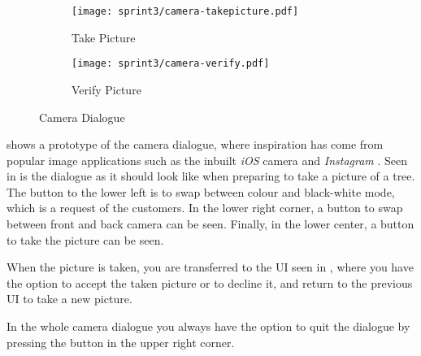 \begin{figure}[h]
     \centering
     \begin{subfigure}{0.45\textwidth}
          \texttt{[image: sprint3/camera-takepicture.pdf]}
          \caption{Take Picture}
          \label{fig:cam-takepic}
     \end{subfigure}      
     \begin{subfigure}{0.45\textwidth}
          \texttt{[image: sprint3/camera-verify.pdf]}
          \caption{Verify Picture}
          \label{fig:cam-verifypic}
     \end{subfigure}
     \caption{Camera Dialogue}
     \label{fig:cam-dialogue}
\end{figure}

 shows a prototype of the camera dialogue, where inspiration has come from popular image applications such as the inbuilt \textit{iOS} \cite{misc:ios} camera and \textit{Instagram} \citep{misc:instagram}.
Seen in  is the dialogue as it should look like when preparing to take a picture of a tree.
The button to the lower left is to swap between colour and black-white mode, which is a request of the customers.
In the lower right corner, a button to swap between front and back camera can be seen.
Finally, in the lower center, a button to take the picture can be seen.

When the picture is taken, you are transferred to the UI seen in , where you have the option to accept the taken picture or to decline it, and return to the previous UI to take a new picture.

In the whole camera dialogue you always have the option to quit the dialogue by pressing the button in the upper right corner.